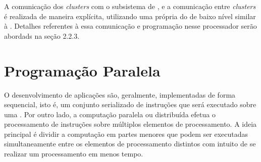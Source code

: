 A comunicação dos \textit{clusters} com o subsistema de \es, e a comunicação
entre \textit{clusters} é realizada de maneira explícita, utilizando uma \api
própria do \mppa de baixo nível similar à \posix \ipc. Detalhes referentes à
essa comunicação e programação nesse processador serão abordads na seção
2.2.3.




\section{Programação Paralela}

O desenvolvimento de aplicações são, geralmente, implementadas de forma
sequencial, isto é, um conjunto serializado de instruções que será executado
sobre uma \cpu. Por outro lado, a computação paralela ou distribuída efetua o
processamento de instruções sobre múltiplos elementos de processamento. A ideia
principal é dividir a computação em partes menores que podem ser executadas
simultaneamente entre os elementos de processamento distintos com intuito de se
realizar um processamento em menos tempo.

